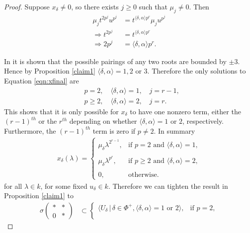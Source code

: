 \begin{proof}
Suppose $x_\delta \neq 0$, so there exists $j \geq 0$ such that $\mu_j \neq 0$. Then
\begin{align}\label{eqn:xfinal}
	\mu_j t^{2p^j} u^{p^j} &= t^{\langle \delta, \alpha \rangle p^r} \mu_j u^{p^j}\nonumber\\
	\Rightarrow t^{2p^j} &= t^{\langle \delta, \alpha \rangle p^r}\nonumber\\
	\Rightarrow 2p^j &= \langle \delta, \alpha \rangle p^r.
\end{align}

In \cite[\S 3.4]{carter1989simple} it is shown that the possible pairings of any two roots are bounded by $\pm 3$. Hence by Proposition \ref{claim1} $\langle \delta, \alpha \rangle = 1, 2$ or 3. Therefore the only solutions to Equation \ref{eqn:xfinal} are
\begin{align*}
&p=2, \quad \langle \delta, \alpha \rangle = 1, \quad j = r - 1, \\
&p\geq 2, \quad \langle \delta, \alpha \rangle = 2, \quad j = r.
\end{align*}
This shows that it is only possible for $x_\delta$ to have one nonzero term, either the $(r-1)^{th}$ or the $r^{th}$ depending on whether $\langle \delta, \alpha \rangle = 1$ or $2$, respectively. Furthermore, the $(r-1)^{th}$ term is zero if $p \neq 2$. In summary
\begin{align}\label{x_loose}
	x_\delta(\lambda) = \left\{\begin{array}{ll}
		\mu_\delta \lambda^{2^{r-1}}, & \textrm{if }p=2\textrm{ and }\langle \delta, \alpha \rangle = 1, \\ \\
		\mu_\delta \lambda^{p^{r}}, & \textrm{if }p\geq 2\textrm{ and }\langle \delta, \alpha \rangle = 2, \\ \\
		0, & \textrm{otherwise.}
	\end{array}\right.
\end{align}
for all $\lambda\in k$, for some fixed $u_\delta\in k$. Therefore we can tighten the result in Proposition \ref{claim1} to
\begin{align*}
	\sigma\left(\begin{matrix}* & *\\0 & *\end{matrix}\right) &\subset
		\left\{\begin{array}{ll}
			\langle U_\delta \,|\, \delta \in \Phi^+, \langle \delta, \alpha\rangle = 1\textrm{ or }2\rangle,&\textrm{if }p = 2, \\ \\

\end{array}
\end{align*}
\end{proof}
